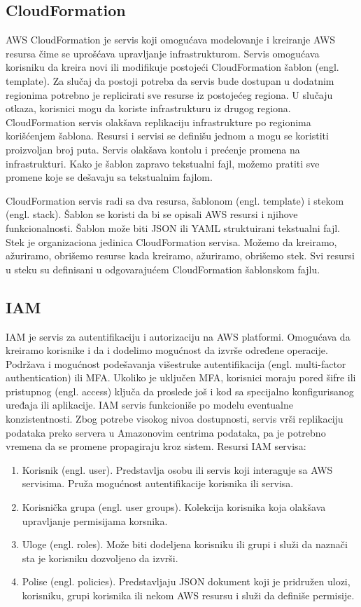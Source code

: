 \documentclass[12pt,oneside]{memoir}
\begin{document}
\subsection{CloudFormation}
 
AWS CloudFormation je servis koji omogućava modelovanje i kreiranje AWS resursa čime se uprošćava upravljanje infrastrukturom. Servis omogućava korisniku da kreira novi ili modifikuje postojeći CloudFormation šablon (engl. template). Za slučaj da postoji potreba da servis bude dostupan u dodatnim regionima potrebno je replicirati sve resurse iz postojećeg regiona. U slučaju otkaza, korisnici mogu da koriste infrastrukturu iz drugog regiona. CloudFormation servis olakšava replikaciju infrastrukture po regionima korišćenjem šablona. Resursi i servisi se definišu jednom a mogu se koristiti proizvoljan broj puta. Servis olakšava kontolu i prećenje promena na infrastrukturi. Kako je šablon zapravo tekstualni fajl, možemo pratiti sve promene koje se dešavaju sa tekstualnim fajlom.
 
CloudFormation servis radi sa dva resursa, šablonom (engl. template) i stekom (engl. stack). Šablon se koristi da bi se opisali AWS resursi i njihove funkcionalnosti. Šablon može biti JSON ili YAML struktuirani tekstualni fajl. Stek je organizaciona jedinica CloudFormation servisa. Možemo da kreiramo, ažuriramo, obrišemo resurse kada kreiramo, ažuriramo, obrišemo stek. Svi resursi u steku su definisani u odgovarajućem CloudFormation šablonskom fajlu.
 
\subsection{IAM}
 
IAM je servis za autentifikaciju i autorizaciju na AWS platformi. Omogućava da kreiramo korisnike i da i dodelimo mogućnost da izvrše određene operacije. Podržava i mogućnost podešavanja višestruke autentifikacija (engl. multi-factor authentication) ili MFA. Ukoliko je uključen MFA, korisnici moraju pored šifre ili pristupnog (engl. access) ključa da proslede još i kod sa specijalno konfigurisanog uređaja ili aplikacije. IAM servis funkcioniše po modelu eventualne konzistentnosti. Zbog potrebe visokog nivoa dostupnosti, servis vrši replikaciju podataka preko servera u Amazonovim centrima podataka, pa je potrebno vremena da se promene propagiraju kroz sistem. Resursi IAM servisa:
\begin{enumerate}
  \item Korisnik (engl. user). Predstavlja osobu ili servis koji interaguje sa AWS servisima. Pruža mogućnost autentifikacije korisnika ili servisa.
  \item Korisnička grupa (engl. user groups). Kolekcija korisnika koja olakšava upravljanje permisijama korsnika.
  \item Uloge (engl. roles). Može biti dodeljena korisniku ili grupi i služi da naznači sta je korisniku dozvoljeno da izvrši.
  \item Polise (engl. policies). Predstavljaju JSON dokument koji je pridružen ulozi, korisniku, grupi korisnika ili nekom AWS resursu i služi da definiše permisije.
\end{enumerate}
\end{document}
